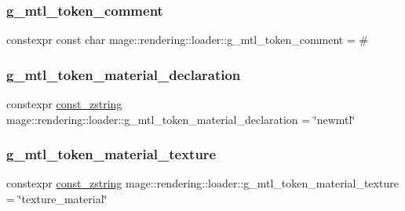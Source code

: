 \hypertarget{namespacemage_1_1rendering_1_1loader_aa434371c99d44cc729773cec213def03}{}\label{namespacemage_1_1rendering_1_1loader_aa434371c99d44cc729773cec213def03} 
\subsubsection{\texorpdfstring{g\+\_\+mtl\+\_\+token\+\_\+comment}{g\_mtl\_token\_comment}}
{\footnotesize\ttfamily constexpr const char mage\+::rendering\+::loader\+::g\+\_\+mtl\+\_\+token\+\_\+comment = \textquotesingle{}\#\textquotesingle{}}

\hypertarget{namespacemage_1_1rendering_1_1loader_a169d9aa2df11fab271c025c0937f1126}{}\label{namespacemage_1_1rendering_1_1loader_a169d9aa2df11fab271c025c0937f1126} 
\subsubsection{\texorpdfstring{g\+\_\+mtl\+\_\+token\+\_\+material\+\_\+declaration}{g\_mtl\_token\_material\_declaration}}
{\footnotesize\ttfamily constexpr \hyperlink{namespacemage_abfd9206dc607ceb5d13ec68bf075a5c0}{const\+\_\+zstring} mage\+::rendering\+::loader\+::g\+\_\+mtl\+\_\+token\+\_\+material\+\_\+declaration = \char`\"{}newmtl\char`\"{}}

\hypertarget{namespacemage_1_1rendering_1_1loader_a0bd068f0f246c00b56412b1bd7f70ed4}{}\label{namespacemage_1_1rendering_1_1loader_a0bd068f0f246c00b56412b1bd7f70ed4} 
\subsubsection{\texorpdfstring{g\+\_\+mtl\+\_\+token\+\_\+material\+\_\+texture}{g\_mtl\_token\_material\_texture}}
{\footnotesize\ttfamily constexpr \hyperlink{namespacemage_abfd9206dc607ceb5d13ec68bf075a5c0}{const\+\_\+zstring} mage\+::rendering\+::loader\+::g\+\_\+mtl\+\_\+token\+\_\+material\+\_\+texture = \char`\"{}texture\+\_\+material\char`\"{}}

